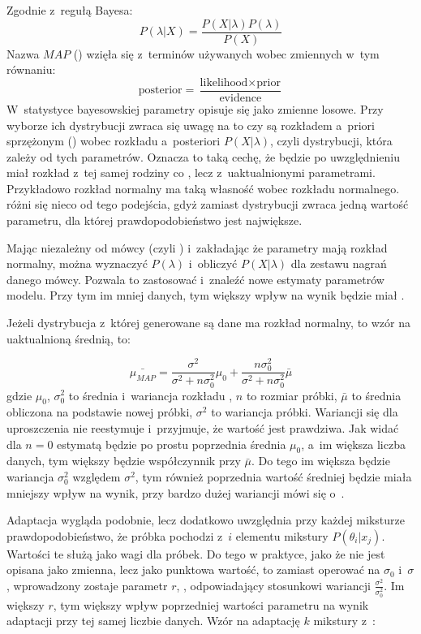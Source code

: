 Zgodnie z~regułą Bayesa:
$$P(\lambda | X) = \frac{P(X | \lambda) P(\lambda)}{P(X)}$$
Nazwa $MAP$ () wzięła się z~terminów używanych wobec zmiennych w~tym równaniu:
$$\text{posterior} = \frac{\text{likelihood} \times \text{prior}}{\text{evidence}}$$
W~statystyce bayesowskiej parametry opisuje się jako zmienne losowe. Przy wyborze ich dystrybucji zwraca się uwagę
na to czy są rozkładem a~priori sprzężonym () wobec rozkładu a~posteriori $P(X | \lambda)$,
czyli dystrybucji, która zależy od tych parametrów.
Oznacza to taką cechę, że  będzie po uwzględnieniu  miał rozkład z~tej samej
rodziny co , lecz z~uaktualnionymi parametrami. Przykładowo rozkład normalny ma taką własność wobec
rozkładu normalnego.   różni się nieco od tego podejścia, gdyż zamiast dystrybucji zwraca jedną
wartość parametru, dla której prawdopodobieństwo jest największe.

Mając  niezależny od mówcy (czyli )
i~zakładając że parametry mają rozkład normalny, można wyznaczyć
$P(\lambda)$ i~obliczyć $P(X | \lambda)$ dla zestawu nagrań danego mówcy. Pozwala to zastosować
 i~znaleźć nowe
estymaty parametrów modelu. Przy tym im mniej danych, tym większy wpływ na wynik będzie miał .

Jeżeli dystrybucja z~której generowane są dane ma rozkład normalny, to wzór na uaktualnioną średnią, to:

$$\bar{\mu_{MAP}} = \frac{\sigma^2}{\sigma^2 + n \sigma_0^2} \mu_0 + \frac{n \sigma^2_0}{\sigma^2 + n \sigma_0^2} \bar{\mu}$$
gdzie $\mu_0$, $\sigma_0^2$ to średnia i~wariancja rozkładu , $n$ to rozmiar próbki, $\bar{\mu}$ to średnia obliczona na podstawie nowej próbki, $\sigma^2$ to wariancja próbki. Wariancji się dla uproszczenia nie reestymuje
i~przyjmuje, że wartość  jest prawdziwa. Jak widać
dla $n = 0$  estymatą będzie po prostu poprzednia średnia $\mu_0$, a~im większa liczba danych, tym
większy będzie współczynnik przy $\bar{\mu}$. Do tego im większa będzie wariancja  $\sigma_0^2$ względem
$\sigma^2$, tym również poprzednia wartość średniej będzie miała mniejszy wpływ na wynik, przy bardzo dużej wariancji
mówi się o~\cite{fundamentalsOfSpeech}.

Adaptacja  wygląda podobnie, lecz dodatkowo uwzględnia przy każdej miksturze prawdopodobieństwo,
że próbka pochodzi z~$i$ elementu mikstury $P(\theta_i | x_j)$. Wartości te służą jako wagi dla próbek. Do tego w
praktyce, jako że  nie jest opisana jako zmienna, lecz jako punktowa wartość, to zamiast
operować na $\sigma_0$ i~$\sigma$, wprowadzony zostaje parametr $r$, , odpowiadający
stosunkowi wariancji $\frac{\sigma^2}{\sigma_0^2}$. Im większy $r$, tym większy wpływ poprzedniej wartości
parametru na wynik adaptacji przy tej samej liczbie danych. Wzór na adaptację $k$ mikstury z~\cite{comparisonOfMultiple}:

